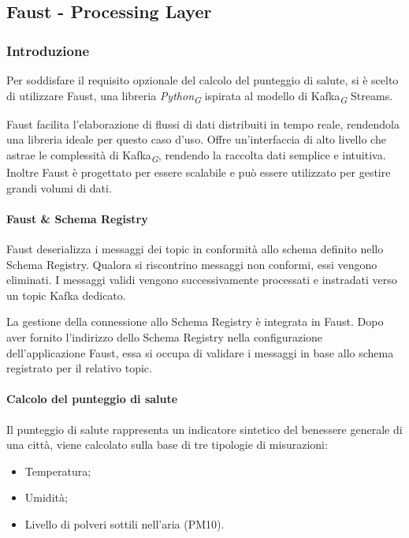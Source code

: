 \subsection{Faust - Processing Layer} \label{sec:faust}

\subsubsection{Introduzione}
Per soddisfare il requisito opzionale del calcolo del punteggio di salute, si è scelto di utilizzare Faust, una libreria \textit{Python}\textsubscript{\textit{G}} ispirata al modello di Kafka\textsubscript{\textit{G}} Streams.

Faust facilita l'elaborazione di flussi di dati distribuiti in tempo reale, rendendola una libreria ideale per questo caso d'uso.
Offre un'interfaccia di alto livello che astrae le complessità di Kafka\textsubscript{\textit{G}}, rendendo la raccolta dati semplice e intuitiva.
Inoltre Faust è progettato per essere scalabile e può essere utilizzato per gestire grandi volumi di dati.

\paragraph{Faust \& Schema Registry} 
Faust deserializza i messaggi dei topic in conformità allo schema definito nello Schema Registry. Qualora si riscontrino messaggi non conformi, essi vengono eliminati. I messaggi validi vengono successivamente processati e instradati verso un topic Kafka dedicato.

La gestione della connessione allo Schema Registry è integrata in Faust. Dopo aver fornito l'indirizzo dello Schema Registry nella configurazione dell'applicazione Faust, essa si occupa di validare i messaggi in base allo schema registrato per il relativo topic.

\paragraph{Calcolo del punteggio di salute}
Il punteggio di salute rappresenta un indicatore sintetico del benessere generale di una città, viene calcolato sulla base di tre tipologie di misurazioni:
\begin{itemize}
    \item Temperatura;
    \item Umidità;
    \item Livello di polveri sottili nell'aria (PM10).
\end{itemize}

